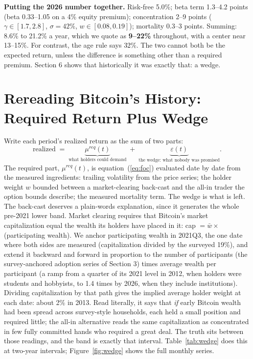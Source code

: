 \documentclass[11pt]{article}
\begin{document}
\textbf{Putting the 2026 number together.} Risk-free 5.0\%; beta term 1.3--4.2 points (beta 0.33--1.05 on a 4\% equity premium); concentration 2--9 points ($\gamma \in [1.7,2.8]$, $\sigma = 42\%$, $w \in [0.08,0.19]$); mortality 0.3--3 points. Summing: 8.6\% to 21.2\% a year, which we quote as \textbf{9--22\%} throughout, with a center near 13--15\%. For contrast, the age rule says 32\%. The two cannot both be the expected return, unless the difference is something other than a required premium. Section 6 shows that historically it was exactly that: a wedge.

\section{Rereading Bitcoin's History: Required Return Plus Wedge}

Write each period's realized return as the sum of two parts:
\begin{equation}
\text{realized} \;=\; \underbrace{\mu^{req}(t)}_{\text{what holders could demand}} \;+\; \underbrace{\varepsilon(t)}_{\text{the wedge: what nobody was promised}}.
\end{equation}
The required part, $\mu^{req}(t)$, is equation~(\ref{eq:foc}) evaluated date by date from the measured ingredients: trailing volatility from the price series; the holder weight $w$ bounded between a market-clearing back-cast and the all-in trader the option bounds describe; the measured mortality term. The wedge is what is left. The back-cast deserves a plain-words explanation, since it generates the whole pre-2021 lower band. Market clearing requires that Bitcoin's market capitalization equal the wealth its holders have placed in it: cap $= \bar{w} \times$ (participating wealth). We anchor participating wealth in 2021Q3, the one date where both sides are measured (capitalization divided by the surveyed 19\%), and extend it backward and forward in proportion to the number of participants (the survey-anchored adoption series of Section 3) times average wealth per participant (a ramp from a quarter of its 2021 level in 2012, when holders were students and hobbyists, to 1.4 times by 2026, when they include institutions). Dividing capitalization by that path gives the implied average holder weight at each date: about 2\% in 2013. Read literally, it says that \emph{if} early Bitcoin wealth had been spread across survey-style households, each held a small position and required little; the all-in alternative reads the same capitalization as concentrated in few fully committed hands who required a great deal. The truth sits between those readings, and the band is exactly that interval. Table~\ref{tab:wedge} does this at two-year intervals; Figure~\ref{fig:wedge} shows the full monthly series.
\end{document}
